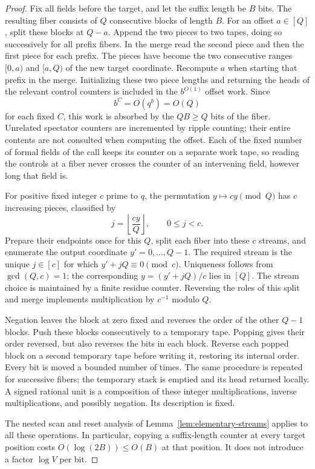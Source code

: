\begin{proof}
Fix all fields before the target, and let the suffix length be $B$ bits.
The resulting fiber consists of $Q$ consecutive blocks of length $B$.
For an offset $a\in[Q]$, split these blocks at $Q-a$.  Append the two
pieces to two tapes, doing so successively for all prefix fibers.  In the
merge read the second piece and then the first piece for each prefix.
The pieces have become the two consecutive ranges $[0,a)$ and $[a,Q)$
of the new target coordinate.  Recompute $a$ when starting that prefix in
the merge.  Initializing these two piece lengths and returning the heads
of the relevant control counters is included in the $b^{O(1)}$ offset
work.  Since
\[
 b^C=O(q^b)=O(Q)
\]
for each fixed $C$, this work is absorbed by the $QB\ge Q$ bits of the
fiber.  Unrelated spectator counters are incremented by ripple counting;
their entire contents are not consulted when computing the offset.
Each of the fixed number of formal fields of the call keeps its counter
on a separate work tape, so reading the controls at a fiber never
crosses the counter of an intervening field, however long that field is.

For positive fixed integer $c$ prime to $q$, the permutation
$y\mapsto cy\pmod Q$ has $c$ increasing pieces, classified by
\[
 j=\left\lfloor\frac{cy}{Q}\right\rfloor,
 \qquad 0\le j<c.
\]
Prepare their endpoints once for this $Q$, split each fiber into these
$c$ streams, and enumerate the output coordinate $y'=0,\ldots,Q-1$.
The required stream is the unique $j\in[c]$ for which
$y'+jQ\equiv0\pmod c$.  Uniqueness follows from $\gcd(Q,c)=1$;
the corresponding $y=(y'+jQ)/c$ lies in $[Q]$.  The stream choice is
maintained by a finite residue counter.  Reversing the roles of this
split and merge implements multiplication by $c^{-1}$ modulo $Q$.

Negation leaves the block at zero fixed and reverses the order of the
other $Q-1$ blocks.  Push these blocks consecutively to a temporary tape.
Popping gives their order reversed, but also reverses the bits in each
block.  Reverse each popped block on a second temporary tape before
writing it, restoring its internal order.  Every bit is moved a bounded
number of times.  The same procedure is repeated for successive fibers;
the temporary stack is emptied and its head returned locally.  A signed
rational unit is a composition of these integer multiplications, inverse
multiplications, and possibly negation.  Its description is fixed.

The nested scan and reset analysis of
Lemma~\ref{lem:elementary-streams} applies to all these operations.  In
particular, copying a suffix-length counter at every target position
costs $O(\log(2B))\le O(B)$ at that position.  It does not introduce a
factor $\log V$ per bit.
\end{proof}

